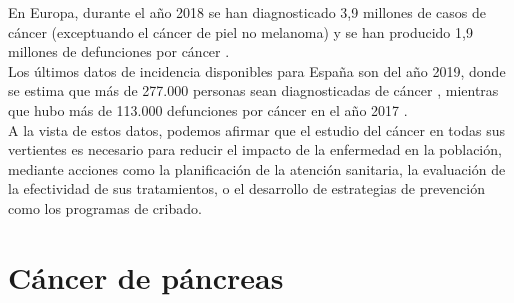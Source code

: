 En Europa, durante el año 2018 se han diagnosticado 3,9 millones de casos de cáncer (exceptuando el cáncer de piel no melanoma) y se han producido 1,9 millones de defunciones por cáncer \cite{ECIS2019}.\\

Los últimos datos de incidencia disponibles para España son del año 2019, donde se estima que más de 277.000 personas sean diagnosticadas de cáncer \cite{Galceran2019}, mientras que hubo más de 113.000 defunciones por cáncer en el año 2017 \cite{INEdef2019}.\\

A la vista de estos datos, podemos afirmar que el estudio del cáncer en todas sus vertientes es necesario para reducir el impacto de la enfermedad en la población, mediante acciones como la planificación de la atención sanitaria, la evaluación de la efectividad de sus tratamientos, o el desarrollo de estrategias de prevención como los programas de cribado.\\


\section{Cáncer de páncreas}
